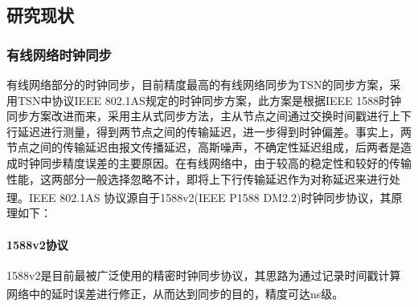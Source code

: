 \documentclass[UTF8,a4paper,12pt]{ctexart}
\numberwithin{equation}{section}
\begin{document}
\subsection{研究现状}
\subsubsection{有线网络时钟同步}

有线网络部分的时钟同步，目前精度最高的有线网络同步为TSN的同步方案，采用TSN中协议IEEE 802.1AS规定的时钟同步方案，此方案是根据IEEE 1588时钟同步方案改进而来，采用主从式同步方法，主从节点之间通过交换时间戳进行上下行延迟进行测量，得到两节点之间的传输延迟，进一步得到时钟偏差。事实上，两节点之间的传输延迟由报文传播延迟，高斯噪声，不确定性延迟组成，后两者是造成时钟同步精度误差的主要原因。在有线网络中，由于较高的稳定性和较好的传输性能，这两部分一般选择忽略不计，即将上下行传输延迟作为对称延迟来进行处理\textsuperscript{\cite{teener2008overview}}。IEEE 802.1AS 协议源自于1588v2(IEEE P1588 DM2.2)时钟同步协议，其原理如下：
\paragraph{1588v2协议}
1588v2是目前最被广泛使用的精密时钟同步协议，其思路为通过记录时间戳计算网络中的延时误差进行修正，从而达到同步的目的，精度可达ns级\textsuperscript{\cite{huayang2011ieee}}。

\begin{figure}[htb] 
\end{figure}
\end{document}
